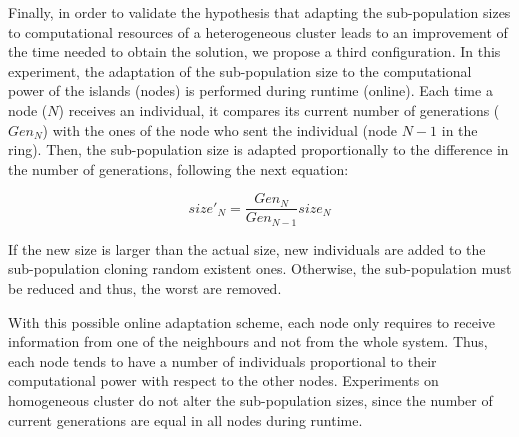 Finally, in order to validate the hypothesis that adapting the
sub-population sizes to computational resources of a heterogeneous
cluster leads to an improvement of the time needed to obtain the
solution,  %
we propose a third configuration. In this experiment, the adaptation
of the sub-population size to the computational power of the islands
(nodes) is performed during runtime (online). %
  Each time a node ($N$) receives an individual, it compares its
  current number of generations ($Gen_{N}$) with the ones of the node
  who sent the individual (node $N-1$ in the ring). Then, the
  sub-population size is adapted proportionally to the difference in
  the number of generations, following the next equation: %

\begin{equation}
size'_{N}=\dfrac{Gen_{N}}{Gen_{N-1}}size_{N}
\end{equation}

If the new size is larger than the actual size, new individuals are
added to the sub-population cloning random existent ones. %
Otherwise, the sub-population must be reduced and thus, the worst are removed.

With this possible online adaptation scheme, each node only requires
to receive information from one of the neighbours and not from the
whole system. %
Thus, each node tends to have a number of individuals proportional to
their computational power with respect to the other nodes. Experiments
on homogeneous cluster do not alter the sub-population sizes, since
the number of current generations are equal in all nodes during
runtime. %

